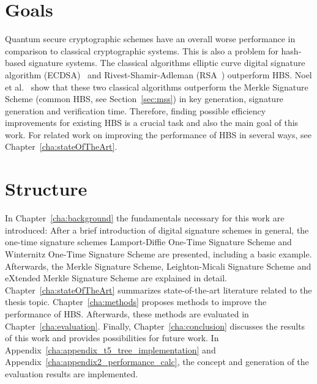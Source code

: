 \section{Goals} 
Quantum secure cryptographic schemes have an overall worse performance in comparison to classical cryptographic systems. %
This is also a problem for hash-based signature systems. The classical algorithms elliptic curve digital signature algorithm (ECDSA)~\cite{ecdsa_main_paper_2001} and Rivest-Shamir-Adleman (RSA~\cite{rsa_patent}) outperform HBS. 
Noel et al.~\cite{comparison_performance_RSA_ECDSA_Merkle_WOTS_2021} show that these two classical algorithms outperform the Merkle Signature Scheme (common HBS, see Section~\ref{sec:mss}) in key generation, signature generation and verification time.
Therefore, finding possible efficiency improvements for existing HBS is a crucial task and also the main goal of this work.
For related work on improving the performance of HBS in several ways, see Chapter~\ref{cha:stateOfTheArt}.

\section{Structure}
In Chapter~\ref{cha:background} the fundamentals necessary for this work are introduced: After a brief introduction of digital signature schemes in general, the one-time signature schemes Lamport-Diffie One-Time Signature Scheme and Winternitz One-Time Signature Scheme are presented, including a basic example. Afterwards, the Merkle Signature Scheme, Leighton-Micali Signature Scheme and eXtended Merkle Signature Scheme are explained in detail. Chapter~\ref{cha:stateOfTheArt} summarizes state-of-the-art literature related to the thesis topic. 
Chapter~\ref{cha:methods} proposes methods to improve the performance of HBS.
Afterwards, these methods are evaluated in Chapter~\ref{cha:evaluation}.
Finally, Chapter~\ref{cha:conclusion} discusses the results of this work and provides possibilities for future work.
In Appendix~\ref{cha:appendix_t5_tree_implementation} and Appendix~\ref{cha:appendix2_performance_calc}, the \extree concept and generation of the evaluation results are implemented.